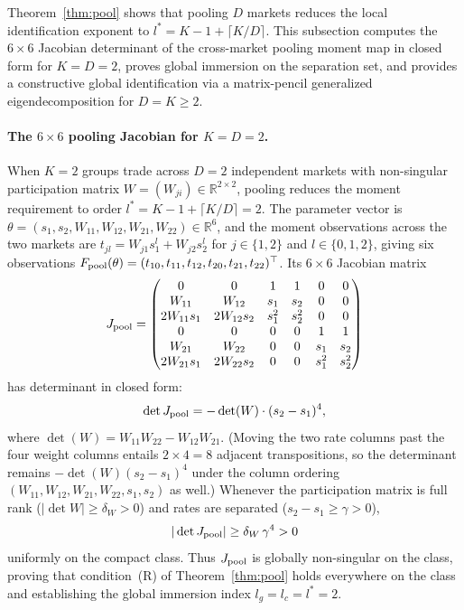 \documentclass[12pt]{article}
\theoremstyle{definition}
\theoremstyle{remark}
\begin{document}
Theorem~\ref{thm:pool} shows that pooling $D$ markets reduces the local identification exponent to $l^* = K - 1 + \lceil K/D \rceil$. This subsection computes the $6\times6$ Jacobian determinant of the cross-market pooling moment map in closed form for $K=D=2$, proves global immersion on the separation set, and provides a constructive global identification via a matrix-pencil generalized eigendecomposition for $D=K\ge2$.

\paragraph{The $6\times6$ pooling Jacobian for $K=D=2$.} When $K=2$ groups trade across $D=2$ independent markets with non-singular participation matrix $W=(W_{ji})\in\mathbb{R}^{2\times2}$, pooling reduces the moment requirement to order $l^*=K-1+\lceil K/D\rceil=2$. The parameter vector is $\theta=(s_1,s_2,W_{11},W_{12},W_{21},W_{22})\in\mathbb{R}^6$, and the moment observations across the two markets are $t_{jl}=W_{j1}s_1^l+W_{j2}s_2^l$ for $j\in\{1,2\}$ and $l\in\{0,1,2\}$, giving six observations $F_{\rm pool}(\theta)=(t_{10},t_{11},t_{12},t_{20},t_{21},t_{22})^\top$. Its $6\times6$ Jacobian matrix
\[
J_{\rm pool} = \begin{pmatrix}
0 & 0 & 1 & 1 & 0 & 0 \\
W_{11} & W_{12} & s_1 & s_2 & 0 & 0 \\
2W_{11}s_1 & 2W_{12}s_2 & s_1^2 & s_2^2 & 0 & 0 \\
0 & 0 & 0 & 0 & 1 & 1 \\
W_{21} & W_{22} & 0 & 0 & s_1 & s_2 \\
2W_{21}s_1 & 2W_{22}s_2 & 0 & 0 & s_1^2 & s_2^2
\end{pmatrix}
\]
has determinant in closed form:
\[
\det J_{\rm pool} = -\det(W)\cdot(s_2-s_1)^4,
\]
where $\det(W)=W_{11}W_{22}-W_{12}W_{21}$. (Moving the two rate columns past the four weight columns entails $2\times4=8$ adjacent transpositions, so the determinant remains $-\det(W)(s_2-s_1)^4$ under the column ordering $(W_{11},W_{12},W_{21},W_{22},s_1,s_2)$ as well.) Whenever the participation matrix is full rank ($|\det W|\ge\delta_W>0$) and rates are separated ($s_2-s_1\ge\gamma>0$),
\[
|\det J_{\rm pool}|\ge\delta_W\,\gamma^4>0
\]
uniformly on the compact class. Thus $J_{\rm pool}$ is globally non-singular on the class, proving that condition~(R) of Theorem~\ref{thm:pool} holds everywhere on the class and establishing the global immersion index $l_g=l_c=l^*=2$.
\end{document}
